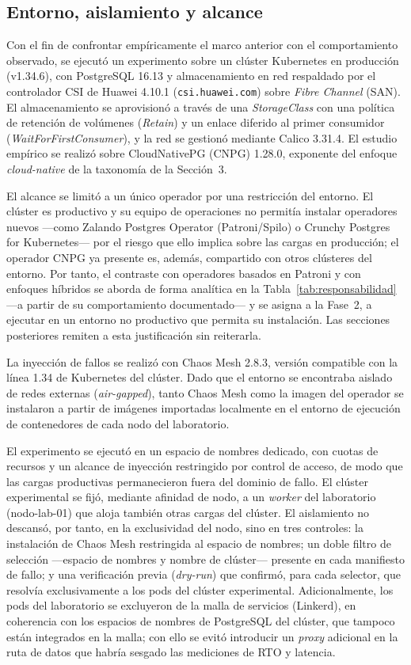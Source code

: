 \documentclass[12pt,twocolumn,letterpaper]{article}
\begin{document}
\subsection{Entorno, aislamiento y alcance}
Con el fin de confrontar empíricamente el marco anterior con el comportamiento observado, se ejecutó un experimento sobre un clúster Kubernetes en producción (v1.34.6), con PostgreSQL 16.13 y almacenamiento en red respaldado por el controlador CSI de Huawei 4.10.1 (\texttt{csi.huawei.com}) sobre \textit{Fibre Channel} (SAN). El almacenamiento se aprovisionó a través de una \textit{StorageClass} con una política de retención de volúmenes (\textit{Retain}) y un enlace diferido al primer consumidor (\textit{WaitForFirstConsumer}), y la red se gestionó mediante Calico 3.31.4. El estudio empírico se realizó sobre CloudNativePG (CNPG) 1.28.0, exponente del enfoque \textit{cloud-native} de la taxonomía de la Sección~3.

El alcance se limitó a un único operador por una restricción del entorno. El clúster es productivo y su equipo de operaciones no permitía instalar operadores nuevos —como Zalando Postgres Operator (Patroni/Spilo) o Crunchy Postgres for Kubernetes— por el riesgo que ello implica sobre las cargas en producción; el operador CNPG ya presente es, además, compartido con otros clústeres del entorno. Por tanto, el contraste con operadores basados en Patroni y con enfoques híbridos se aborda de forma analítica en la Tabla~\ref{tab:responsabilidad} —a partir de su comportamiento documentado— y se asigna a la Fase~2, a ejecutar en un entorno no productivo que permita su instalación. Las secciones posteriores remiten a esta justificación sin reiterarla.

La inyección de fallos se realizó con Chaos Mesh 2.8.3, versión compatible con la línea 1.34 de Kubernetes del clúster. Dado que el entorno se encontraba aislado de redes externas (\textit{air-gapped}), tanto Chaos Mesh como la imagen del operador se instalaron a partir de imágenes importadas localmente en el entorno de ejecución de contenedores de cada nodo del laboratorio.

El experimento se ejecutó en un espacio de nombres dedicado, con cuotas de recursos y un alcance de inyección restringido por control de acceso, de modo que las cargas productivas permanecieron fuera del dominio de fallo. El clúster experimental se fijó, mediante afinidad de nodo, a un \textit{worker} del laboratorio (nodo-lab-01) que aloja también otras cargas del clúster. El aislamiento no descansó, por tanto, en la exclusividad del nodo, sino en tres controles: la instalación de Chaos Mesh restringida al espacio de nombres; un doble filtro de selección —espacio de nombres y nombre de clúster— presente en cada manifiesto de fallo; y una verificación previa (\textit{dry-run}) que confirmó, para cada selector, que resolvía exclusivamente a los pods del clúster experimental. Adicionalmente, los pods del laboratorio se excluyeron de la malla de servicios (Linkerd), en coherencia con los espacios de nombres de PostgreSQL del clúster, que tampoco están integrados en la malla; con ello se evitó introducir un \textit{proxy} adicional en la ruta de datos que habría sesgado las mediciones de RTO y latencia.
\end{document}
